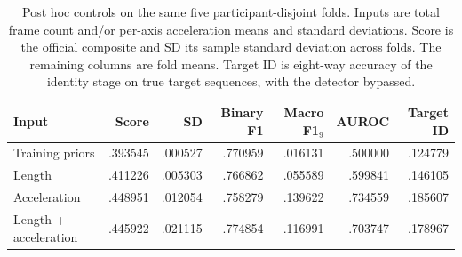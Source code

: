 \begin{table}[htbp]
\centering\small
\caption{Post hoc controls on the same five participant-disjoint folds. Inputs are total frame count and/or per-axis acceleration means and standard deviations. Score is the official composite and SD its sample standard deviation across folds. The remaining columns are fold means. Target ID is eight-way accuracy of the identity stage on true target sequences, with the detector bypassed.}
\label{tab:length-control}
\setlength{\tabcolsep}{3.5pt}
\begin{tabular}{@{}lrrrrrr@{}}\toprule
Input & Score & SD & Binary F1 & Macro F1$_9$ & AUROC & Target ID\\\midrule
Training priors & .393545 & .000527 & .770959 & .016131 & .500000 & .124779\\
Length & .411226 & .005303 & .766862 & .055589 & .599841 & .146105\\
Acceleration & .448951 & .012054 & .758279 & .139622 & .734559 & .185607\\
Length + acceleration & .445922 & .021115 & .774854 & .116991 & .703747 & .178967\\
\bottomrule\end{tabular}
\end{table}
